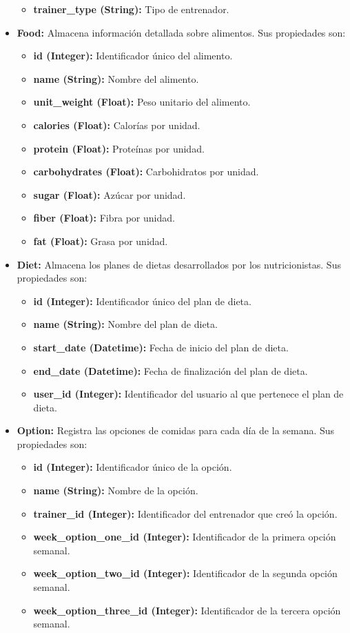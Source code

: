 \begin{itemize}
\begin{itemize}
        \item \textbf{trainer\_type (String):} Tipo de entrenador.
    \end{itemize}
    \item \textbf{Food:} Almacena información detallada sobre alimentos. Sus propiedades son:
    \begin{itemize}
        \item \textbf{id (Integer):} Identificador único del alimento.
        \item \textbf{name (String):} Nombre del alimento.
        \item \textbf{unit\_weight (Float):} Peso unitario del alimento.
        \item \textbf{calories (Float):} Calorías por unidad.
        \item \textbf{protein (Float):} Proteínas por unidad.
        \item \textbf{carbohydrates (Float):} Carbohidratos por unidad.
        \item \textbf{sugar (Float):} Azúcar por unidad.
        \item \textbf{fiber (Float):} Fibra por unidad.
        \item \textbf{fat (Float):} Grasa por unidad.
    \end{itemize}
    \item \textbf{Diet:} Almacena los planes de dietas desarrollados por los nutricionistas. Sus propiedades son:
    \begin{itemize}
        \item \textbf{id (Integer):} Identificador único del plan de dieta.
        \item \textbf{name (String):} Nombre del plan de dieta.
        \item \textbf{start\_date (Datetime):} Fecha de inicio del plan de dieta.
        \item \textbf{end\_date (Datetime):} Fecha de finalización del plan de dieta.
        \item \textbf{user\_id (Integer):} Identificador del usuario al que pertenece el plan de dieta.
    \end{itemize}
    \item \textbf{Option:} Registra las opciones de comidas para cada día de la semana. Sus propiedades son:
    \begin{itemize}
        \item \textbf{id (Integer):} Identificador único de la opción.
        \item \textbf{name (String):} Nombre de la opción.
        \item \textbf{trainer\_id (Integer):} Identificador del entrenador que creó la opción.
        \item \textbf{week\_option\_one\_id (Integer):} Identificador de la primera opción semanal.
        \item \textbf{week\_option\_two\_id (Integer):} Identificador de la segunda opción semanal.
        \item \textbf{week\_option\_three\_id (Integer):} Identificador de la tercera opción semanal.
    \end{itemize}
\end{itemize}

